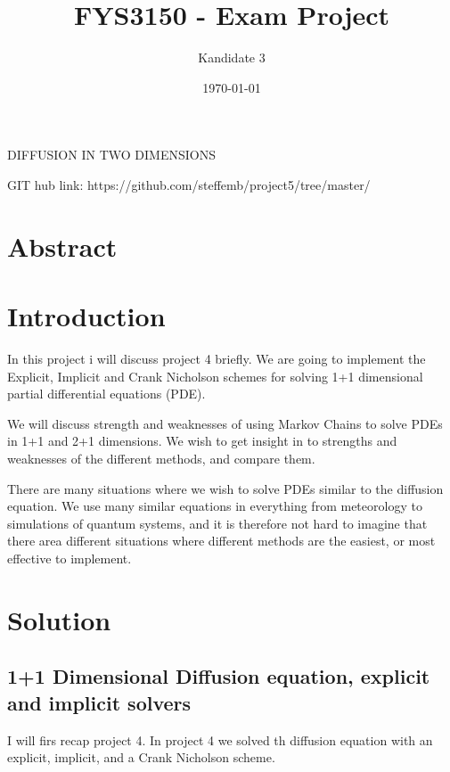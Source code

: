 \documentclass[english,a4paper,12pt]{article}
\title{FYS3150 - Exam Project}
\author{Kandidate 3}
\date{\today}
\begin{document}
\maketitle

\begin{center}
 DIFFUSION IN TWO DIMENSIONS
\end{center}


\begin{center}
GIT hub link: https://github.com/steffemb/project5/tree/master/
\end{center}

\newpage

\section*{Abstract}


\section*{Introduction}

In this project i will discuss project 4 briefly. We are going to implement the Explicit, Implicit and Crank Nicholson
schemes for solving 1+1 dimensional partial differential equations (PDE).

We will discuss strength and weaknesses of using Markov Chains to solve PDEs in 1+1 and 2+1 dimensions. We wish to
get insight in to strengths and weaknesses of the different methods, and compare them.

There are many situations where we wish to solve PDEs similar to the diffusion equation. We use many similar equations in 
everything from meteorology to simulations of quantum systems, and it is therefore not hard to imagine that there area different
situations where different methods are the easiest, or most effective to implement. 


\section*{Solution}

\subsection*{1+1 Dimensional Diffusion equation, explicit and implicit solvers}

I will firs recap project 4. In project 4 we solved th diffusion equation with an explicit, implicit, and a Crank Nicholson scheme.
\end{document}
